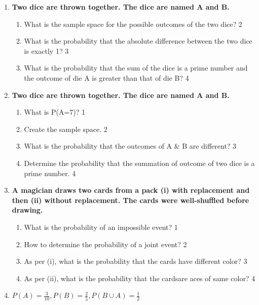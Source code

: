 \documentclass[a4paper,oneside, margin=1.4in]{book}
\begin{document}
\begin{enumerate}
  
  \item  
  \textbf{Two dice are thrown together. The dice are named A and B.}  

  \begin{enumerate}  
    \item  
    	What is the sample space for the possible outcomes of the two dice? \hfill 2  
    \item  
    	What is the probability that the absolute difference between the two dice is exactly 1? \hfill 3  
    \item  
    	What is the probability that the sum of the dice is a prime number and the outcome of die A is greater than that of die B? \hfill 4  
  \end{enumerate}  


 \item
	  \textbf{Two dice are thrown together. The dice are named A and B.} 
  
  \begin{enumerate}
    \item
	What is P(A=7)? \hfill 1
    \item
	Create the sample space. \hfill 2
    \item  
	What is the probability that the outcomes of A \& B are different? \hfill 3
    \item
	Determine the probability that the summation of outcome of two dice is a prime number. \hfill 4
  \end{enumerate}

 \item
	  \textbf{A magician draws two cards from a pack (i) with replacement and then (ii) without replacement. The cards were well-shuffled before drawing.} 
  
  \begin{enumerate}
    \item
	What is the probability of an impossible event? \hfill 1
    \item
	How to determine the probability of a joint event?  \hfill 2
    \item  
	As per (i), what is the probability that the cards have different color? \hfill 3
    \item
	As per (ii), what is the probability that the cardsare aces of same color?  \hfill 4
  \end{enumerate}

 \item
	  \textbf{$P(A) = \frac{3}{10}, P(B) = \frac 25, P(B\cup A) = \frac12$} 
  

\end{enumerate}
\end{document}
